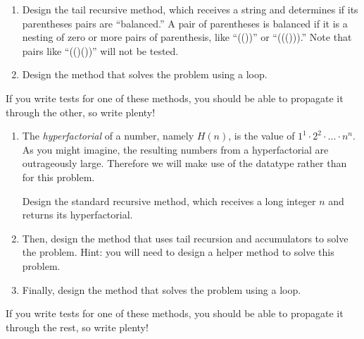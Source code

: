 \begin{enumerate}[label=(\alph*)]
    \item Design the  tail recursive method, which receives a string and determines if its parentheses pairs are ``balanced.'' A pair of parentheses is balanced if it is a nesting of zero or more pairs of parenthesis, like ``(())'' or ``((())).'' Note that pairs like ``(()())'' will not be tested.

    \item Design the  method that solves the problem using a loop.
\end{enumerate}

If you write tests for one of these methods, you should be able to propagate it through the other, so write plenty!


\begin{enumerate}[label=(\alph*)]
    \item The \emph{hyperfactorial} of a number, namely $H(n)$, is the value of $1^1 \cdot 2^2 \cdot ... \cdot n^n$. As you might imagine, the resulting numbers from a hyperfactorial are outrageously large. Therefore we will make use of the  datatype rather than  for this problem. 
    
    Design the standard recursive  method, which receives a long integer $n$ and returns its hyperfactorial.
    \item Then, design the  method that uses tail recursion and accumulators to solve the problem. Hint: you will need to design a  helper method to solve this problem.

    \item Finally, design the  method that solves the problem using a loop.
\end{enumerate}

If you write tests for one of these methods, you should be able to propagate it through the rest, so write plenty!


